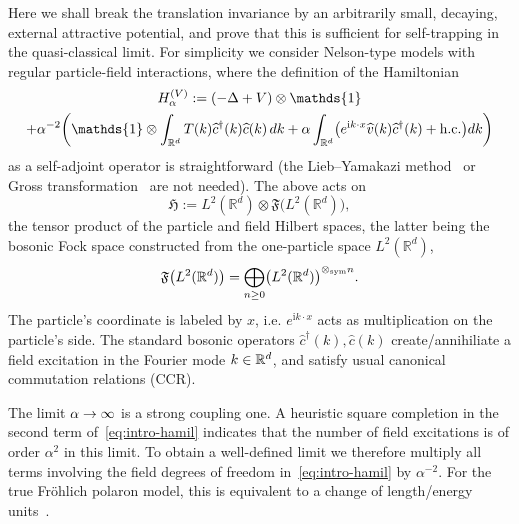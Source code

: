 \documentclass[AHL,Unicode,longabstracts,published]{cedram}
\DeclareMathOperator{\symm}{sym}
\newcommand{\im}{\mathrm{i}}
\newcommand{\R}{\mathbb{R}}
\newcommand{\gH}{\mathfrak{H}}
\newcommand{\gF}{\mathfrak{F}}
\newcommand{\1}{\mathds{1}}
\let\oldin\in
\renewcommand{\in}{\mathchoice{\oldin}{\oldin}{\,\oldin\,}{\,\oldin\,}}
\renewcommand*{\to}{\mathchoice{\longrightarrow}{\rightarrow}{\rightarrow}{\rightarrow}}
\let\originalleft\left
\let\originalright\right
\renewcommand{\left}{\mathopen{}\mathclose\bgroup\originalleft}
\renewcommand{\right}{\aftergroup\egroup\originalright}
\begin{document}
Here we shall break the translation invariance by an arbitrarily small, decaying, external attractive potential, and prove that this is sufficient for self-trapping in the quasi-classical limit. For simplicity we consider Nelson-type models with regular particle-field interactions, where the definition of the Hamiltonian
\begin{multline}\label{eq:intro-hamil}
H_\alpha ^{(V)} := \left(-\Delta + V\right) \otimes \1 \\
+ \alpha^{-2}\left(\1 \otimes \int_{\R^d} T(k) \widehat{c}^\dagger (k) \widehat{c} (k)\,dk + \alpha \int_{\R^d} \left(e^{\im k\cdot x} \widehat{v} (k) \widehat{c}^{\dagger} (k) + \text{h.c.} \right)dk \right)
\end{multline}
as a self-adjoint operator is straightforward (the Lieb--Yamakazi method~\cite{LieYam-58} or Gross transformation~\cite{Seiringer-19} are not needed). The above acts on
\begin{equation}\label{eq:intro-hilbert}
\gH := L^2 (\R^d) \otimes \gF \bigl(L^2 (\R^d)\bigr),
\end{equation}
the tensor product of the particle and field Hilbert spaces, the latter being the bosonic Fock space constructed from the one-particle space $L^2 (\R^d)$,
\begin{equation*}
\gF \left(L^2 (\R^d)\right) = \bigoplus_{n\geq 0} \left(L^2 (\R^d)\right)^{\otimes_{\symm} n}.
\end{equation*}
The particle's coordinate is labeled by $x$, i.e. $e^{\im k\cdot x}$ acts as multiplication on the particle's side. The standard bosonic operators $\widehat{c}^\dagger (k),\widehat{c}(k)$ create/annihiliate a field excitation in the Fourier mode $k\in\R^d$, and satisfy usual canonical commutation relations (CCR).

The limit $\alpha \to \infty$ is a strong coupling one. A heuristic square completion in the second term of~\eqref{eq:intro-hamil} indicates that the number of field excitations is of order $\alpha^2$ in this limit. To obtain a well-defined limit we therefore multiply all terms involving the field degrees of freedom in~\eqref{eq:intro-hamil} by $\alpha^{-2}$. For the true Fr\"ohlich polaron model, this is equivalent to a change of length/energy units~\cite{Seiringer-19}.
\end{document}
